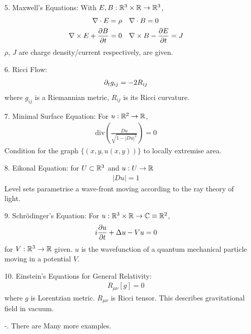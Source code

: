 \documentclass[10pt,a4paper]{report}
\begin{document}
\begin{itemize}
\item[5.] Maxwell's Equations:
With $E,B : \mathbb{R}^3 \times \mathbb{R} \rightarrow \mathbb{R}^3$,
\begin{align*}
\nabla \cdot E = \rho & \quad \nabla \cdot B =0 \\
\nabla \times E + \frac{\partial B}{\partial t} =0 & \quad \nabla \times B - \frac{\partial E}{\partial t} = J
\end{align*}
$\rho$, $J$ are charge density/current respectively, are given.

\item[6.] Ricci Flow:
\begin{align*}
\partial_t g_{ij} = -2R_{ij}
\end{align*}
where $g_{ij}$ is a Riemannian metric, $R_{ij}$ is its Ricci curvature.

\item[7.] Minimal Surface Equation:
For $u: \mathbb{R}^2 \rightarrow \mathbb{R}$,
\begin{align*}
\text{div}(\frac{Du}{\sqrt{1-|Du|^2}}) =0
\end{align*}
Condition for the graph $\{ (x,y,u(x,y)) \}$ to locally extremise area.

\item[8.] Eikonal Equation:
for $U\subset \mathbb{R}^3$ and $u:U\rightarrow \mathbb{R}$
\begin{align*}
|Du|=1
\end{align*}
Level sets parametrise a wave-front moving according to the ray theory of light. 

\item[9.] Schr\"{o}dinger's Equation:
For $u:\mathbb{R}^3 \times \mathbb{R} \rightarrow \mathbb{C} \equiv \mathbb{R}^2$,
\begin{align*}
i\frac{\partial u}{\partial t} + \Delta u - Vu =0
\end{align*}
for $V: \mathbb{R}^3\rightarrow \mathbb{R}$ given. $u$ is the wavefunction of a quantum mechanical particle moving in a potential $V$.

\item[10.] Einstein's Equations for General Relativity:
\begin{align*}
R_{\mu \nu}[g] =0
\end{align*}
where $g$ is Lorentzian metric. $R_{\mu \nu}$ is Ricci tensor. This describes gravitational field in vacuum.

\item[-.] There are Many more examples.
\end{itemize}
\end{document}
